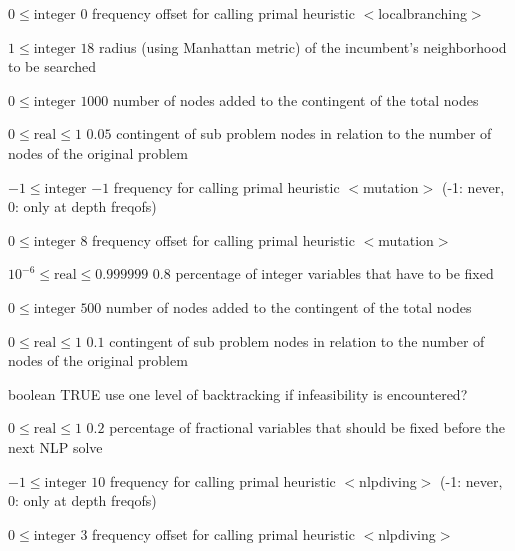 %
{$0\leq\textrm{integer}$}%
{$0$}%
{frequency offset for calling primal heuristic $<$localbranching$>$}%
{}

%
{$1\leq\textrm{integer}$}%
{$18$}%
{radius (using Manhattan metric) of the incumbent's neighborhood to be searched}%
{}

%
{$0\leq\textrm{integer}$}%
{$1000$}%
{number of nodes added to the contingent of the total nodes}%
{}

%
{$0\leq\textrm{real}\leq1$}%
{$0.05$}%
{contingent of sub problem nodes in relation to the number of nodes of the original problem}%
{}

%
{$-1\leq\textrm{integer}$}%
{$-1$}%
{frequency for calling primal heuristic $<$mutation$>$ (-1: never, 0: only at depth freqofs)}%
{}

%
{$0\leq\textrm{integer}$}%
{$8$}%
{frequency offset for calling primal heuristic $<$mutation$>$}%
{}

%
{$10^{- 6}\leq\textrm{real}\leq0.999999$}%
{$0.8$}%
{percentage of integer variables that have to be fixed}%
{}

%
{$0\leq\textrm{integer}$}%
{$500$}%
{number of nodes added to the contingent of the total nodes}%
{}

%
{$0\leq\textrm{real}\leq1$}%
{$0.1$}%
{contingent of sub problem nodes in relation to the number of nodes of the original problem}%
{}

%
{boolean}%
{TRUE}%
{use one level of backtracking if infeasibility is encountered?}%
{}

%
{$0\leq\textrm{real}\leq1$}%
{$0.2$}%
{percentage of fractional variables that should be fixed before the next NLP solve}%
{}

%
{$-1\leq\textrm{integer}$}%
{$10$}%
{frequency for calling primal heuristic $<$nlpdiving$>$ (-1: never, 0: only at depth freqofs)}%
{}

%
{$0\leq\textrm{integer}$}%
{$3$}%
{frequency offset for calling primal heuristic $<$nlpdiving$>$}%
{}

